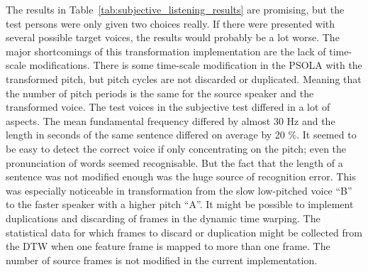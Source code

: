 The results in Table~\ref{tab:subjective_listening_results} are promising, but the test persons were only given two choices really. If there were presented with several possible target voices, the results would probably be a lot worse. The major shortcomings of this transformation implementation are the lack of time-scale modifications. There is some time-scale modification in the PSOLA with the transformed pitch, but pitch cycles are not discarded or duplicated. Meaning that the number of pitch periods is the same for the source speaker and the transformed voice. The test voices in the subjective test differed in a lot of aspects. The mean fundamental frequency differed by almost 30 Hz and the length in seconds of the same sentence differed on average by 20 \%. It seemed to be easy to detect the correct voice if only concentrating on the pitch; even the pronunciation of words seemed recognisable. But the fact that the length of a sentence was not modified enough was the huge source of recognition error. This was especially noticeable in transformation from the slow low-pitched voice ``B'' to the faster speaker with a higher pitch ``A''. It might be possible to implement duplications and discarding of frames in the dynamic time warping. The statistical data for which frames to discard or duplication might be collected from the DTW when one feature frame is mapped to more than one frame. The number of source frames is not modified in the current implementation.


